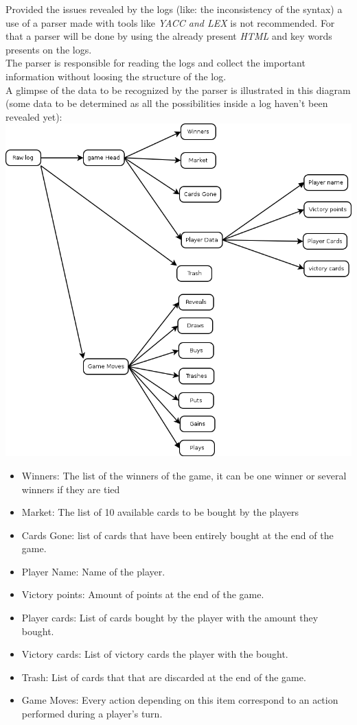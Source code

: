 \documentclass{scrreprt}
\begin{document}
Provided the issues revealed by the logs (like: the inconsistency of the syntax)
a use of a parser made with tools like \textit{YACC and LEX} is not recommended.
For that a parser will be done by using the already present \textit{HTML} and
key words presents on the logs.\\
The parser is responsible for reading the logs and collect the important
information without loosing the structure of the log.\\
A glimpse of the data to be recognized by the parser is illustrated in this
diagram (some data to be determined as all the possibilities inside a log
haven't been revealed yet):\\
\includegraphics[scale=0.35,keepaspectratio]{UseCaseParser}

\begin{itemize}
\item Winners: The list of the winners of the game, it can be one winner or several winners if they are tied
\item Market: The list of 10 available cards to be bought by the players
\item Cards Gone: list of cards that have been entirely bought at the end of the game.
\item Player Name: Name of the player.
\item Victory points: Amount of points at the end of the game.
\item Player cards: List of cards bought by the player with the amount they bought.
\item Victory cards: List of victory cards the player with the bought.
\item Trash: List of cards that that are discarded at the end of the game.
\item Game Moves: Every action depending on this item correspond to an action performed during a player's turn.
\end{itemize}
\end{document}
